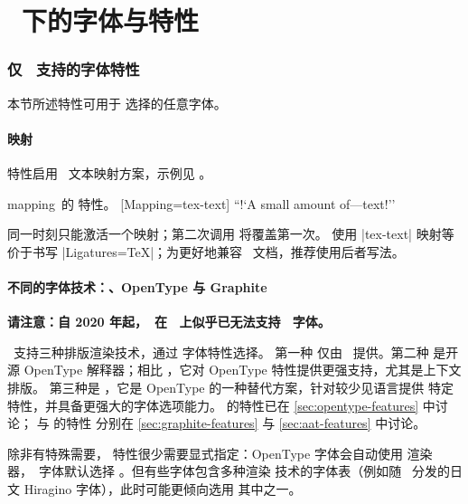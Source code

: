 \documentclass[a4paper]{l3doc}
\begin{document}
\part{\XeTeX\ 下的字体与特性}
\label{sec:xetex-features}

\section{仅 \XeTeX\ 支持的字体特性}

本节所述特性可用于  选择的任意字体。

\subsection{映射}
\label{sec:mapping}

 特性启用 \XeTeX\ 文本映射方案，示例见 。

\begin{Xexample}{mapping}{\XeTeX\ 的  特性。}
  [Mapping=tex-text]
  ``!`A small amount of---text!''
\end{Xexample}

同一时刻只能激活一个映射；第二次调用  将覆盖第一次。
使用 |tex-text| 映射等价于书写 |Ligatures=TeX|；为更好地兼容
\LuaTeX\ 文档，推荐使用后者写法。


\subsection{不同的字体技术：\AAT、OpenType 与 Graphite}\label{sec:renderer-xetex}

\textbf{请注意：自 2020 年起，\XeTeX\ 在 \MacOSX\ 上似乎已无法支持 \AAT\ 字体。}

\XeTeX\ 支持三种排版渲染技术，通过  字体特性选择。
第一种  仅由 \MacOSX\ 提供。第二种  是开源 OpenType
解释器；相比 ，它对 OpenType 特性提供更强支持，尤其是上下文排版。
第三种是 ，它是 OpenType 的一种替代方案，针对较少见语言提供
特定特性，并具备更强大的字体选项能力。 的特性已在
\vref{sec:opentype-features} 中讨论； 与  的特性
分别在 \vref{sec:graphite-features} 与 \vref{sec:aat-features} 中讨论。

除非有特殊需要， 特性很少需要显式指定：OpenType 字体会自动使用
 渲染器，\AAT\ 字体默认选择 。但有些字体包含多种渲染
技术的字体表（例如随 \MacOSX\ 分发的日文 Hiragino 字体），此时可能更倾向选用
其中之一。
\end{document}
